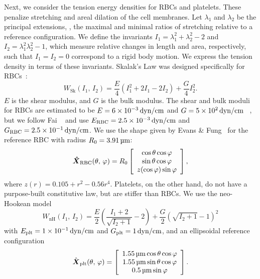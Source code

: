 Next, we consider the tension energy densities for RBCs and platelets. These penalize
stretching and areal dilation of the cell membranes. Let $\lambda_1$ and $\lambda_2$ be
the principal extensions, , the maximal and minimal  ratios of stretching
relative to a reference configuration. We define the invariants $I_1=\lambda_1^2+\lambda_2^2-2$
and $I_2 = \lambda_1^2\lambda_2^2-1$, which measure relative changes in length and area,
respectively, such that $I_1 = I_2 = 0$ correspond to a rigid body motion. We express the
tension density in terms of these invariants. Skalak's Law was designed specifically for
RBCs~\cite{Skalak:1973tp}:
\begin{equation}\label{eq:skalak-law}
    W_\text{Sk}(I_1,\,I_2) = \frac{E}4\left(I_1^2 + 2I_1 - 2I_2\right) + \frac{G}4 I_2^2.
\end{equation}
$E$ is the shear modulus, and $G$ is the bulk modulus. The shear and bulk moduli for RBCs
are estimated to be $E = 6\sci{-3}\dynpercm$ and $G = 5\sci2\dynpercm$~%
\cite{Mohandas:1994tg}, but we follow Fai ~\cite{Fai:2013do} and use
$\rbc{E} = 2.5\sci{-3}\dynpercm$ and $\rbc{G} = 2.5\sci{-1}\dynpercm$. We use
the shape given by Evans \& Fung~\cite{Evans:1972uf} for the reference RBC with radius
$R_0 = 3.91\um$:
\begin{equation*}
    {\boldsymbol{\hat{X}}}_\text{RBC}(\theta,\,\varphi) = R_0\left[\begin{array}{c}
            \cos\theta\cos\varphi \\
            \sin\theta\cos\varphi \\
            z(\cos\varphi)\sin\varphi
    \end{array}\right],
\end{equation*}
where $z(r) = 0.105 + r^2 - 0.56r^4$. Platelets, on the other hand, do not have a
purpose-built constitutive law, but are stiffer than RBCs. We use the neo-Hookean model
\begin{equation}\label{eq:neohookean}
    W_\text{nH}(I_1,\,I_2) = \frac{E}2\left(\frac{I_1+2}{\sqrt{I_2+1}}-2\right) + \frac{G}2 \left(\sqrt{I_2+1}-1\right)^2
\end{equation}
with $\plt{E} = 1\sci{-1}\dynpercm$ and $\plt{G} = 1\dynpercm$, and an ellipsoidal
reference configuration~\cite{Frojmovic:1982wk}
\begin{equation*}
    \plt{\hat{\vec{X}}}(\theta,\,\varphi) = \left[\begin{array}{c}
            1.55\um\cos\theta\cos\varphi \\
            1.55\um\sin\theta\cos\varphi \\
            0.5\um\sin\varphi
    \end{array}\right].
\end{equation*}

